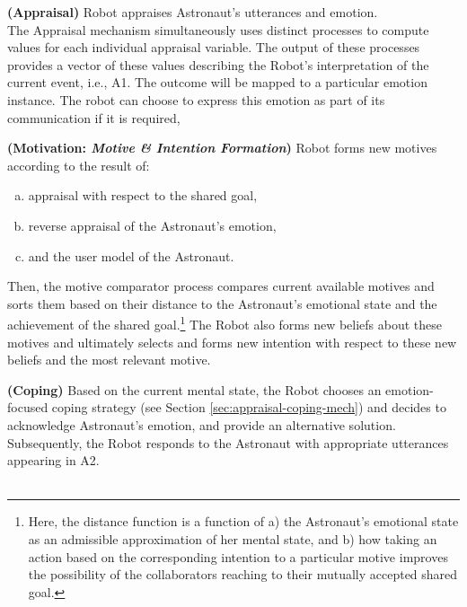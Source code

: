\noindent\item \textbf{(Appraisal)} Robot appraises Astronaut's utterances and
emotion.\\

The Appraisal mechanism simultaneously uses distinct processes to compute values
for each individual appraisal variable. The output of these processes provides a
vector of these values describing the Robot's interpretation of the current
event, i.e., A1. The outcome will be mapped to a particular emotion instance.
The robot can choose to express this emotion as part of its communication if it
is required,\\

\noindent\item \textbf{(Motivation: \textit{Motive \& Intention Formation})}
Robot forms new motives according to the result of:

\begin{enumerate}[a)]
  \item appraisal with respect to the shared goal,
  \item reverse appraisal of the Astronaut's emotion,
  \item and the user model of the Astronaut. 
\end{enumerate}

Then, the motive comparator process compares current available motives and
sorts them based on their distance to the Astronaut's emotional state and
the achievement of the shared goal.\footnote{Here, the distance function is a
function of a) the Astronaut's emotional state as an admissible approximation
of her mental state, and b) how taking an action based on the corresponding
intention to a particular motive improves the possibility of the collaborators
reaching to their mutually accepted shared goal.} The Robot also forms new
beliefs about these motives and ultimately selects and forms new intention with
respect to these new beliefs and the most relevant motive.\\

\noindent\item \textbf{(Coping)} Based on the current mental state, the Robot
chooses an emotion-focused coping strategy (see Section
\ref{sec:appraisal-coping-mech}) and decides to acknowledge Astronaut's emotion,
and provide an alternative solution. Subsequently, the Robot responds to the
Astronaut with appropriate utterances appearing in A2.\\

\noindent {}\\

